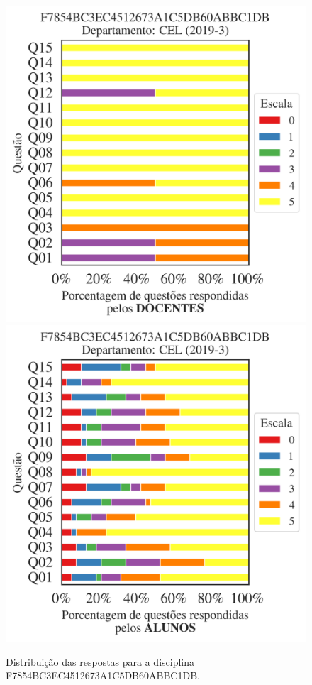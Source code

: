 \documentclass[a4paper,10pt]{article}
\begin{document}
\begin{figure}[h]
\centering
\includegraphics[width=0.485\linewidth]{analise_disciplina_departamento_CEL_F7854BC3EC4512673A1C5DB60ABBC1DB_docentes.png}
\includegraphics[width=0.485\linewidth]{analise_disciplina_departamento_CEL_F7854BC3EC4512673A1C5DB60ABBC1DB_alunos.png}
\caption{\label{fig:analise_geral_departamento}                Distribuição das respostas para a disciplina F7854BC3EC4512673A1C5DB60ABBC1DB. }
\end{figure}
\end{document}

